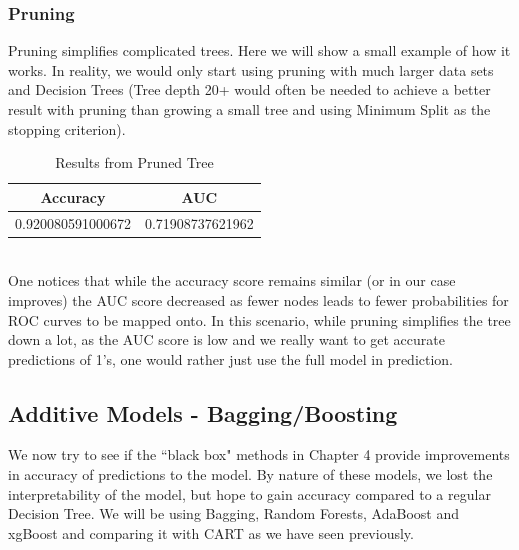 \documentclass[11pt,a4paper]{report}
\begin{document}
\subsubsection{Pruning}
Pruning simplifies complicated trees. 
Here we will show a small example of how it works. 
In reality, we would only start using pruning with much larger data sets and Decision Trees (Tree depth 20+ would often be needed to achieve a better result with pruning than growing a small tree and using Minimum Split as the stopping criterion).
\begin{table}
    \centering
    \begin{tabular}{|c|c|}
        \hline
        \textbf{Accuracy} & \textbf{AUC} \\
        \hline
        0.920080591000672 & 0.71908737621962 \\
        \hline
    \end{tabular}
    \caption{Results from Pruned Tree}
    \label{tab:prunescore}
\end{table}
\medskip\\
One notices that while the accuracy score remains similar (or in our case improves) the AUC score decreased as fewer nodes leads to fewer probabilities for ROC curves to be mapped onto.
In this scenario, while pruning simplifies the tree down a lot, as the AUC score is low and we really want to get accurate predictions of 1's, one would rather just use the full model in prediction.


\subsection{Additive Models - Bagging/Boosting}
We now try to see if the ``black box" methods in Chapter 4 provide improvements in accuracy of predictions to the model.
By nature of these models, we lost the interpretability of the model, but hope to gain accuracy compared to a regular Decision Tree.
We will be using Bagging, Random Forests, AdaBoost and xgBoost and comparing it with CART as we have seen previously.
\end{document}
